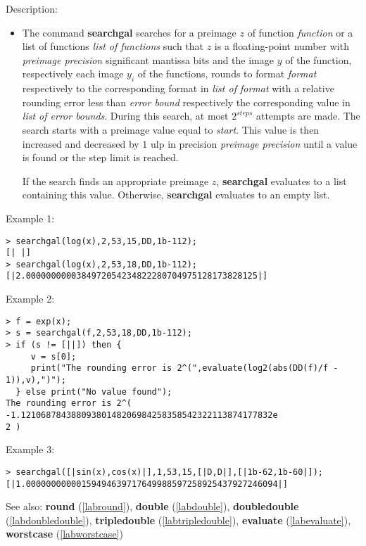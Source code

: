 \noindent Description: \begin{itemize}

\item The command \textbf{searchgal} searches for a preimage $z$ of function
   \emph{function} or a list of functions \emph{list of functions} such that
   $z$ is a floating-point number with \emph{preimage precision}
   significant mantissa bits and the image $y$ of the function,
   respectively each image $y_i$ of the functions, rounds to
   format \emph{format} respectively to the corresponding format in \emph{list of format} 
   with a relative rounding error less than \emph{error bound}
   respectively the corresponding value in \emph{list of error bounds}. During
   this search, at most $2^{steps}$ attempts are made. The search
   starts with a preimage value equal to \emph{start}. This value is then
   increased and decreased by $1$ ulp in precision \emph{preimage precision} 
   until a value is found or the step limit is reached.
    
   If the search finds an appropriate preimage $z$, \textbf{searchgal}
   evaluates to a list containing this value. Otherwise, \textbf{searchgal}
   evaluates to an empty list.
\end{itemize}
\noindent Example 1: 
\begin{center}\begin{minipage}{15cm}\begin{Verbatim}[frame=single]
> searchgal(log(x),2,53,15,DD,1b-112);
[| |]
> searchgal(log(x),2,53,18,DD,1b-112);
[|2.0000000000384972054234822280704975128173828125|]
\end{Verbatim}
\end{minipage}\end{center}
\noindent Example 2: 
\begin{center}\begin{minipage}{15cm}\begin{Verbatim}[frame=single]
> f = exp(x);
> s = searchgal(f,2,53,18,DD,1b-112);
> if (s != [||]) then {
     v = s[0];
     print("The rounding error is 2^(",evaluate(log2(abs(DD(f)/f - 1)),v),")");
  } else print("No value found");
The rounding error is 2^( -1.12106878438809380148206984258358542322113874177832e
2 )
\end{Verbatim}
\end{minipage}\end{center}
\noindent Example 3: 
\begin{center}\begin{minipage}{15cm}\begin{Verbatim}[frame=single]
> searchgal([|sin(x),cos(x)|],1,53,15,[|D,D|],[|1b-62,1b-60|]);
[|1.00000000000159494639717649988597258925437927246094|]
\end{Verbatim}
\end{minipage}\end{center}
See also: \textbf{round} (\ref{labround}), \textbf{double} (\ref{labdouble}), \textbf{doubledouble} (\ref{labdoubledouble}), \textbf{tripledouble} (\ref{labtripledouble}), \textbf{evaluate} (\ref{labevaluate}), \textbf{worstcase} (\ref{labworstcase})
